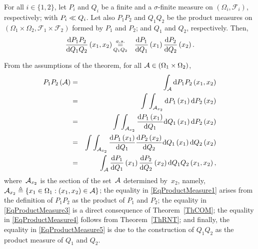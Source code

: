 \documentclass[lettersize,onecolumn]{IEEEtran}
\begin{document}
 \begin{theorem}
For all $i \in \lbrace 1,2 \rbrace$, let $P_{i}$ and $Q_{i}$ be a finite and a $\sigma$-finite measure on $\left( \Omega_i, \mathscr{F}_i \right)$, respectively; with ${P_i}\ll{Q_i}$.  Let also $P_1P_2$ and 
$Q_1 Q_2$ be the product measures on $\left( \Omega_1 \times \Omega_2, \mathscr{F}_1 \times \mathscr{F}_2 \right)$ formed by $P_1$ and $P_2$; and $Q_1$ and $Q_2$, 
respectively. Then, 
 \begin{eqnarray}
  \label{EqProductMeasure0}
\frac{\mathrm{d}P_{1} P_{2}}{\mathrm{d}Q_1Q_2}\left(x_1, x_2\right) &\displaystyle\mathop{ \stackrel{a.s.}{=}}_{Q_1Q_2}& \frac{\mathrm{d}P_{1}}{\mathrm{d}Q_1} \left(x_1\right)\frac{\mathrm{d}P_{2}}{\mathrm{d}Q_2}\left(x_2\right).
\end{eqnarray}
 \end{theorem}
\begin{IEEEproof}
From the assumptions of the theorem, for all $\mathcal A \in \left(\Omega_1 \times\Omega_2 \right)$,
\begin{eqnarray}
 \label{EqProductMeasure1}
P_{1} P_{2}\left(\mathcal A\right) &=& \int_{\mathcal A} \mathrm{d}P_{1} P_{2}\left(x_1, x_2\right) \\
 \label{EqProductMeasure2}
&=& \int \int_{\mathcal A_{x_2}} \mathrm{d}P_{1}\left(x_1\right) \mathrm{d}P_{2}\left(x_2\right)\\
 \label{EqProductMeasure3}
&=& \int \int_{\mathcal A_{x_2}}\dfrac{\mathrm{d}P_{1}\left(x_1\right)}{\mathrm{d}Q_1} \mathrm{d}Q_1\left(x_1\right) \mathrm{d}P_{2}\left(x_2\right) \\
 \label{EqProductMeasure4}
&=& \int \int_{\mathcal A_{x_2}} \dfrac{\mathrm{d}P_{1}\left(x_1\right)}{\mathrm{d}Q_1} \dfrac{\mathrm{d}P_{2}\left(x_2\right)}{\mathrm{d}Q_2} \mathrm{d}Q_1\left(x_1\right) \mathrm{d}Q_2\left(x_2\right) \\
 \label{EqProductMeasure5}
&=& \int_{\mathcal A} \dfrac{\mathrm{d}P_{1}}{\mathrm{d}Q_1}\left(x_1\right) \dfrac{\mathrm{d}P_{2}}{\mathrm{d}Q_2}\left(x_2\right) \mathrm{d}Q_1Q_2\left(x_1, x_2\right), 
\end{eqnarray}
where~$\mathcal A_{x_2}$ is the section of the set~$\mathcal A$ determined by~$x_2$, namely, $\mathcal A_{x_2} \triangleq \left\lbrace x_1 \in \Omega_1: (x_1,x_2) \in \mathcal A \right\rbrace$;  the equality in \eqref{EqProductMeasure1} arises from the definition of $P_1P_2$  as the product of $P_1 $ and  $P_2$; 
the equality in \eqref{EqProductMeasure3} is a direct consequence of Theorem~\ref{ThCOM};  
the equality in \eqref{EqProductMeasure4} follows from Theorem~\ref{ThRNT}; and finally, the equality in \eqref{EqProductMeasure5} is due to the construction of  $Q_1Q_2$ as the product measure of  $Q_1$ and $Q_2$.


\end{IEEEproof}
\end{document}
